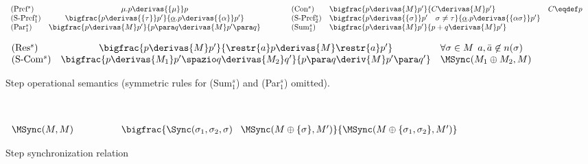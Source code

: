\begin{table}[t]
\hrulefill\\[-.4cm]

{\renewcommand{\arraystretch}{2.5}
\begin{center}
$\begin{array}{lcllllcl}
\mbox{(Pref$^s$)}  & \mu.p\derivas{\{\mu\}}p & \qquad &
\mbox{(Con$^s$)} & \bigfrac{p\derivas{M}p'}{C \derivas{M}p'}& C \eqdef p &  \\
\mbox{(S-Pref$_1^s$)}  & \bigfrac{p\derivas{\{\tau\}}p'}{\underline{\alpha}.p\derivas{\{\alpha\}}p'} & \qquad &
\mbox{(S-Pref$_2^s$)}  & \bigfrac{p\derivas{\{\sigma\}}p' \quad \sigma \neq \tau}{\underline{\alpha}.p\derivas{\{\alpha\sigma\}}p'} \\

\mbox{(Par$_1^s$)}  & \bigfrac{p\derivas{M}p'}{p\para q\derivas{M}p'\para q} & \qquad &
\mbox{(Sum$_1^s$)}  & \bigfrac{p\derivas{M}p'}{p+q\derivas{M}p'} \\
\end{array}$

$\begin{array}{lcllcl}

\mbox{(Res$^s$)}  & \bigfrac{p\derivas{M}p'}{\restr{a}p\derivas{M}
\restr{a}p'} & \forall \sigma \in M\, \; a, \bar{a} \not\in n(\sigma)\;  &\\

\mbox{(S-Com$^s$)}  & \bigfrac{p\derivas{M_1} p'\spazio q\derivas{M_2}q'}{p
\para q \deriv{M}p'\para q'} & \MSync(M_1 \oplus M_2, M) &\\
\end{array}$

\hrulefill
\end{center}}
\caption{Step operational semantics (symmetric rules for (Sum$_1^s$) and (Par$_1^s$) omitted).}\label{step-rules}
\end{table}


\begin{table}[t]
\hrulefill\\[-.4cm]
\begin{center}

$\begin{array}{lcr}
\MSync(M, M) & \qquad \quad & \bigfrac{\Sync(\sigma_1, \sigma_2, \sigma) \; \;  \; \MSync(M\oplus\{\sigma\}, M')}
{\MSync(M \oplus \{\sigma_1, \sigma_2\}, M' )}  
\end{array}$

\end{center}
\hrulefill
\caption{Step synchronization relation}\label{Msync}
\end{table}

